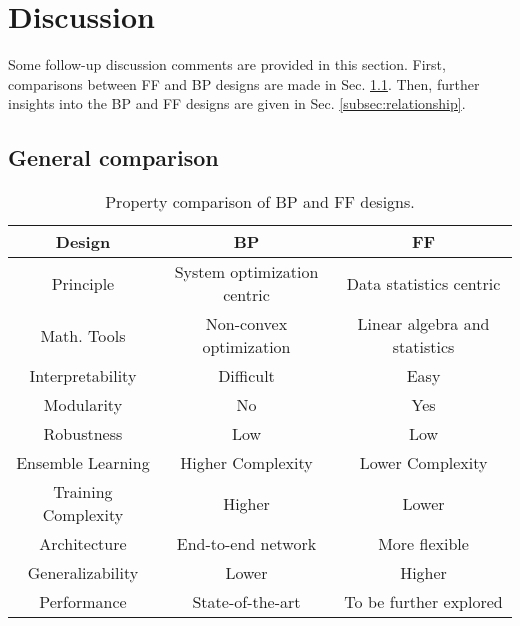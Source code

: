\documentclass[preprint,12pt]{elsarticle}
\begin{document}
\section{Discussion}\label{sec:discussion}

Some follow-up discussion comments are provided in this section.  First,
comparisons between FF and BP designs are made in Sec.
\ref{subsec:comparison}. Then, further insights into the BP and FF
designs are given in Sec.  \ref{subsec:relationship}. 

\subsection{General comparison}\label{subsec:comparison}

\begin{table}[thb]
\begin{center}
\footnotesize
\begin{tabular}{|c|c|c|} \hline
Design          & BP                         & FF                       \\ \hline
Principle       & System optimization centric& Data statistics centric  \\ \hline
Math. Tools     & Non-convex optimization    & Linear algebra and statistics \\ \hline
Interpretability& Difficult                  & Easy                     \\ \hline
Modularity      & No                         & Yes                      \\ \hline
Robustness      & Low                        & Low                      \\ \hline
Ensemble Learning & Higher Complexity        & Lower Complexity         \\ \hline
Training Complexity  & Higher                & Lower                    \\ \hline
Architecture    & End-to-end network         & More flexible            \\ \hline
Generalizability& Lower                      & Higher                   \\ \hline
Performance     & State-of-the-art           & To be further explored   \\ \hline
\end{tabular}
\end{center}
\caption{Property comparison of BP and FF designs.}\label{table:comparison}
\end{table}
\end{document}
